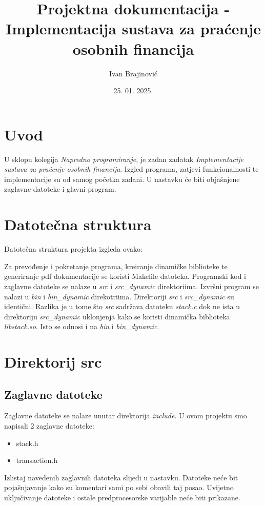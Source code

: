 \documentclass[12pt, letterpaper]{article}
\title{Projektna dokumentacija - Implementacija sustava za praćenje osobnih financija}
\author{Ivan Brajinović}
\date{25. 01. 2025.}
\begin{document}
	\maketitle

	\newpage
  \section{Uvod}
  U sklopu kolegija \textit{Napredno programiranje}, je zadan zadatak \textit{Implementacije sustava za praćenje osobnih financija}. Izgled programa, zatjevi funkcionalnosti te implementacije su od samog početka zadani. U nastavku će biti objašnjene zaglavne datoteke i glavni program.

	\section{Datotečna struktura}
	Datotečna struktura projekta izgleda ovako:
  

  Za prevođenje i pokretanje programa, kreiranje dinamičke biblioteke te generiranje pdf dokumentacije se koristi Makefile datoteka.
  Programski kod i zaglavne datoteke se nalaze u \textit{src} i \textit{src\_dynamic} direktoriima.
  Izvršni program se nalazi u \textit{bin} i \textit{bin\_dynamic} direkotriima.
  Direktoriji \textit{src} i \textit{src\_dynamic} su identični. Razlika je u tome što \textit{src} sadržava datoteku \textit{stack.c} dok ne ista u direktoriju \textit{src\_dynamic} uklonjenja kako se koristi dinamička biblioteka \textit{libstack.so}. Isto se odnosi i na \textit{bin} i \textit{bin\_dynamic}.

\section{Direktorij src}
		
  \subsection{Zaglavne datoteke}
  Zaglavne datoteke se nalaze unutar direktorija \textit{include}. U ovom projektu smo napisali 2 zaglavne datoteke:
  \begin{itemize}
    \item stack.h
    \item transaction.h
  \end{itemize}
  Izlistaj navedenih zaglavnih datoteka slijedi u nastavku. Datoteke neće bit pojašnjavanje kako su komentari sami po sebi obavili taj posao. Uvijetno uključivanje datoteke i ostale predprocesorske varijable neće biti prikazane.
\end{document}
